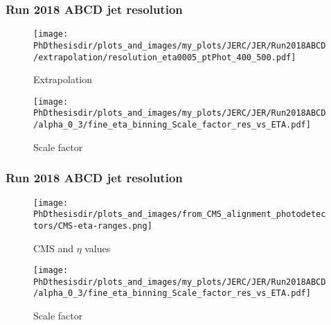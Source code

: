 \begin{frame}
\frametitle{Run 2018 ABCD jet resolution}
\begin{minipage}{.45\textwidth}
\begin{figure}
\texttt{[image: \\PhDthesisdir/plots\_and\_images/my\_plots/JERC/JER/Run2018ABCD/extrapolation/resolution\_eta0005\_ptPhot\_400\_500.pdf]}
\caption{Extrapolation}
\end{figure}
\end{minipage}
\hfill
\begin{minipage}{.45\textwidth}
\begin{figure}
\texttt{[image: \\PhDthesisdir/plots\_and\_images/my\_plots/JERC/JER/Run2018ABCD/alpha\_0\_3/fine\_eta\_binning\_Scale\_factor\_res\_vs\_ETA.pdf]}
\caption{Scale factor}
\end{figure}
\end{minipage}
\end{frame}

\begin{frame}\addtocounter{framenumber}{-1}
\frametitle{Run 2018 ABCD jet resolution}
\begin{minipage}{.45\textwidth}
\begin{figure}
\texttt{[image: \\PhDthesisdir/plots\_and\_images/from\_CMS\_alignment\_photodetectors/CMS-eta-ranges.png]}
\caption{CMS and $\eta$ values}
\end{figure}
\end{minipage}
\hfill
\begin{minipage}{.45\textwidth}
\begin{figure}
\texttt{[image: \\PhDthesisdir/plots\_and\_images/my\_plots/JERC/JER/Run2018ABCD/alpha\_0\_3/fine\_eta\_binning\_Scale\_factor\_res\_vs\_ETA.pdf]}
\caption{Scale factor}
\end{figure}
\end{minipage}
\end{frame}
